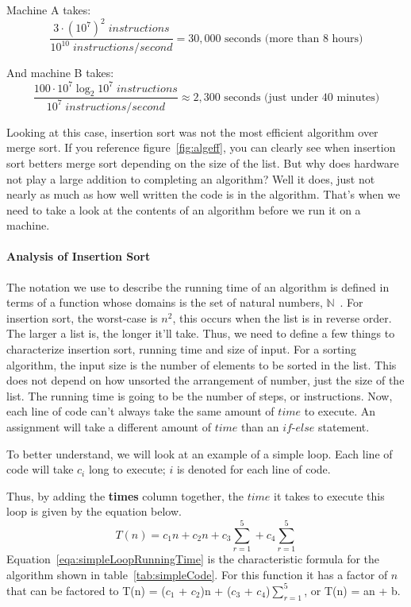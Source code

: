 \documentclass[12pt]{article}
\begin{document}
	Machine A takes:
	\begin{equation}
	\frac{3\cdot(10^7)^2 \;instructions}{10^{10} \;instructions/\!second}=30,000\mbox{ seconds (more than 8 hours)}
	\end{equation}
	
	And machine B takes:
	\begin{equation}	
	\frac{100\cdot 10^7\log_2{10^7}\;instructions}{10^{7} \;instructions/\!second}\approx2,300\mbox{ seconds (just under 40 minutes)}
	\end{equation}
	
	Looking at this case, insertion sort was not the most efficient algorithm over merge sort.
	If you reference figure~\ref{fig:algeff}, you can clearly see when insertion sort betters merge sort depending on the size of the list.
	But why does hardware not play a large addition to completing an algorithm?
	Well it does, just not nearly as much as how well written the code is in the algorithm.
	That's when we need to take a look at the contents of an algorithm before we run it on a machine.
	
	\paragraph{Analysis of Insertion Sort}
	
	The notation we use to describe the running time of an algorithm is defined in terms of a function whose domains is the set of natural numbers, $\mathbb{N}$~\cite[p.~43]{intro}.
	For insertion sort, the worst-case is $n^2$, this occurs when the list is in reverse order.
	The larger a list is, the longer it'll take.
	Thus, we need to define a few things to characterize insertion sort, running time and size of input.
	For a sorting algorithm, the input size is the number of elements to be sorted in the list.
	This does not depend on how unsorted the arrangement of number, just the size of the list.
	The running time is going to be the number of steps, or instructions.
	Now, each line of code can't always take the same amount of $\textit{time}$ to execute.
	An assignment will take a different amount of $\textit{time}$ than an $\textit{if-else}$ statement.
	
	To better understand, we will look at an example of a simple loop.
	Each line of code will take $c_i$ long to execute; $i$ is denoted for each line of code.
	
	Thus, by adding the \textbf{times} column together, the $\textit{time}$ it takes to execute this loop is given by the equation below.
	\begin{equation}
	T(n) = c_1n + c_2n + c_3\sum_{r=1}^{5} + c_4\sum_{r=1}^{5}
	\label{eqa:simpleLoopRunningTime}
	\end{equation}
	Equation~\ref{eqa:simpleLoopRunningTime} is the characteristic formula for the algorithm shown in table~\ref{tab:simpleCode}.
	For this function it has a factor of $n$ that can be factored to T(n) = ($c_1$ + $c_2$)n + ($c_3$ + $c_4$)$\sum_{r=1}^{5}$, or T(n) = an + b.
	
\end{document}
